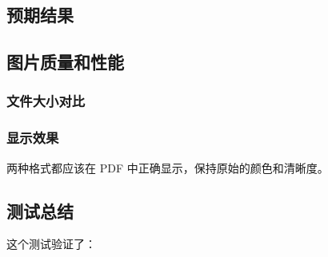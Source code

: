 \documentclass[UTF8, a4paper, 12pt]{ctexart}
\begin{document}
\subsection{预期结果}


\subsection{图片质量和性能}


\subsubsection{文件大小对比}


\subsubsection{显示效果}


两种格式都应该在 PDF 中正确显示，保持原始的颜色和清晰度。


\subsection{测试总结}


这个测试验证了：
\end{document}

